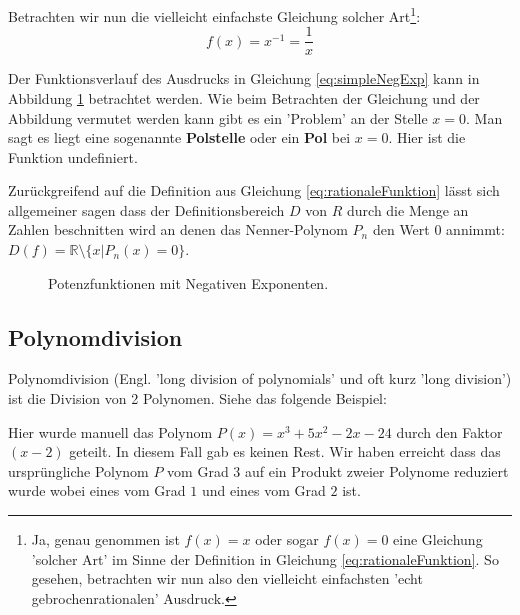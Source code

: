 Betrachten wir nun die vielleicht einfachste Gleichung solcher Art\footnote{Ja, genau genommen ist $f(x) = x$ oder sogar $f(x) = 0$ eine Gleichung 'solcher Art' im Sinne der Definition in Gleichung \ref{eq:rationaleFunktion}. So gesehen, betrachten wir nun also den vielleicht einfachsten 'echt gebrochenrationalen' Ausdruck.}:
\begin{equation}
	f(x) = x^{-1} = \frac{1}{x} \label{eq:simpleNegExp}
\end{equation}

Der Funktionsverlauf des Ausdrucks in Gleichung \ref{eq:simpleNegExp} kann in Abbildung \ref{fig:ratio1} betrachtet werden. Wie beim Betrachten der Gleichung und der Abbildung vermutet werden kann gibt es ein 'Problem' an der Stelle $x=0$. Man sagt es liegt eine sogenannte \textbf{Polstelle} oder ein \textbf{Pol} bei $x=0$. Hier ist die Funktion undefiniert. 

Zurückgreifend auf die Definition aus Gleichung \ref{eq:rationaleFunktion} lässt sich allgemeiner sagen dass der Definitionsbereich $D$ von $R$ durch die Menge an Zahlen beschnitten wird an denen das Nenner-Polynom $P_n$ den Wert 0 annimmt: $D(f) = \mathbb{R} \setminus \{x | P_n(x)=0\}$. 


\begin{figure}[H]
	\centering
	
	\caption{Potenzfunktionen mit Negativen Exponenten.}
	\label{fig:ratio1}
\end{figure}





\subsection{Polynomdivision}
Polynomdivision (Engl. 'long division of polynomials' und oft kurz 'long division') ist die Division von 2 Polynomen. Siehe das folgende Beispiel:



Hier wurde manuell das Polynom $P(x) = x^{3} + 5 x^{2} - 2 x - 24$ durch den Faktor $(x-2)$ geteilt. In diesem Fall gab es keinen Rest. Wir haben erreicht dass das ursprüngliche Polynom $P$ vom Grad $3$ auf ein Produkt zweier Polynome reduziert wurde wobei eines vom Grad $1$ und eines vom Grad $2$ ist. 

